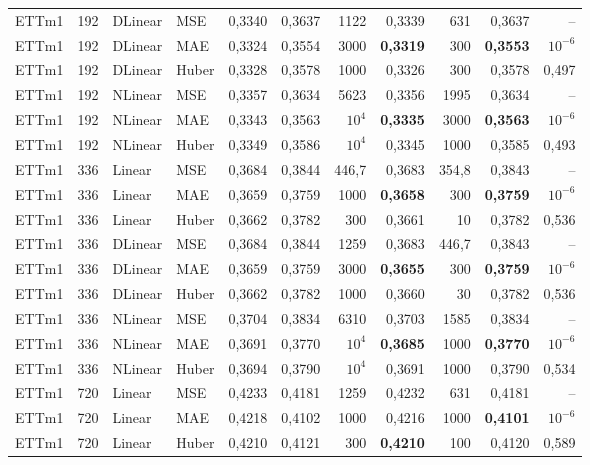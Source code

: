 {\begin{longtable}{@{}lrll rr rr rr r@{}}
\addlinespace[2pt]
ETTm1 & 192 & DLinear & MSE & 0{,}3340 & 0{,}3637 & 1122 & 0{,}3339 & 631 & 0{,}3637 & -- \\
ETTm1 & 192 & DLinear & MAE & 0{,}3324 & 0{,}3554 & 3000 & \textbf{0{,}3319} & 300 & \textbf{0{,}3553} & $10^{-6}$ \\
ETTm1 & 192 & DLinear & Huber & 0{,}3328 & 0{,}3578 & 1000 & 0{,}3326 & 300 & 0{,}3578 & 0{,}497 \\
\addlinespace[2pt]
ETTm1 & 192 & NLinear & MSE & 0{,}3357 & 0{,}3634 & 5623 & 0{,}3356 & 1995 & 0{,}3634 & -- \\
ETTm1 & 192 & NLinear & MAE & 0{,}3343 & 0{,}3563 & $10^{4}$ & \textbf{0{,}3335} & 3000 & \textbf{0{,}3563} & $10^{-6}$ \\
ETTm1 & 192 & NLinear & Huber & 0{,}3349 & 0{,}3586 & $10^{4}$ & 0{,}3345 & 1000 & 0{,}3585 & 0{,}493 \\
\addlinespace[2pt]
ETTm1 & 336 & Linear & MSE & 0{,}3684 & 0{,}3844 & 446{,}7 & 0{,}3683 & 354{,}8 & 0{,}3843 & -- \\
ETTm1 & 336 & Linear & MAE & 0{,}3659 & 0{,}3759 & 1000 & \textbf{0{,}3658} & 300 & \textbf{0{,}3759} & $10^{-6}$ \\
ETTm1 & 336 & Linear & Huber & 0{,}3662 & 0{,}3782 & 300 & 0{,}3661 & 10 & 0{,}3782 & 0{,}536 \\
\addlinespace[2pt]
ETTm1 & 336 & DLinear & MSE & 0{,}3684 & 0{,}3844 & 1259 & 0{,}3683 & 446{,}7 & 0{,}3843 & -- \\
ETTm1 & 336 & DLinear & MAE & 0{,}3659 & 0{,}3759 & 3000 & \textbf{0{,}3655} & 300 & \textbf{0{,}3759} & $10^{-6}$ \\
ETTm1 & 336 & DLinear & Huber & 0{,}3662 & 0{,}3782 & 1000 & 0{,}3660 & 30 & 0{,}3782 & 0{,}536 \\
\addlinespace[2pt]
ETTm1 & 336 & NLinear & MSE & 0{,}3704 & 0{,}3834 & 6310 & 0{,}3703 & 1585 & 0{,}3834 & -- \\
ETTm1 & 336 & NLinear & MAE & 0{,}3691 & 0{,}3770 & $10^{4}$ & \textbf{0{,}3685} & 1000 & \textbf{0{,}3770} & $10^{-6}$ \\
ETTm1 & 336 & NLinear & Huber & 0{,}3694 & 0{,}3790 & $10^{4}$ & 0{,}3691 & 1000 & 0{,}3790 & 0{,}534 \\
\addlinespace[2pt]
ETTm1 & 720 & Linear & MSE & 0{,}4233 & 0{,}4181 & 1259 & 0{,}4232 & 631 & 0{,}4181 & -- \\
ETTm1 & 720 & Linear & MAE & 0{,}4218 & 0{,}4102 & 1000 & 0{,}4216 & 1000 & \textbf{0{,}4101} & $10^{-6}$ \\
ETTm1 & 720 & Linear & Huber & 0{,}4210 & 0{,}4121 & 300 & \textbf{0{,}4210} & 100 & 0{,}4120 & 0{,}589 \\

\end{longtable}}

